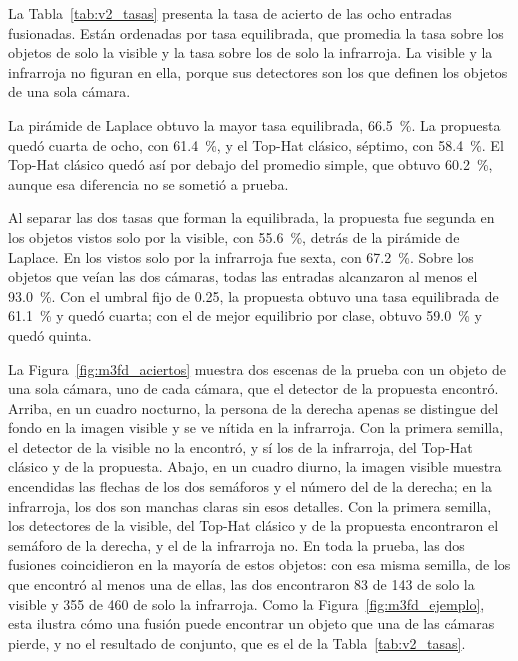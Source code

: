 La Tabla~\ref{tab:v2_tasas} presenta la tasa de acierto de las ocho entradas fusionadas. Están ordenadas
por tasa equilibrada, que promedia la tasa sobre los objetos de solo la visible y la tasa sobre los de
solo la infrarroja. La visible y la infrarroja no figuran en ella, porque sus detectores son los que
definen los objetos de una sola cámara.



La pirámide de Laplace obtuvo la mayor tasa equilibrada, 66.5~\%. La propuesta quedó cuarta de ocho,
con 61.4~\%, y el Top-Hat clásico, séptimo, con 58.4~\%. El Top-Hat clásico quedó así por debajo del
promedio simple, que obtuvo 60.2~\%, aunque esa diferencia no se sometió a prueba.

Al separar las dos tasas que forman la equilibrada, la propuesta fue segunda en los objetos vistos solo
por la visible, con 55.6~\%, detrás de la pirámide de Laplace. En los vistos solo por la infrarroja fue
sexta, con 67.2~\%. Sobre los objetos que veían las dos cámaras, todas las entradas alcanzaron al menos
el 93.0~\%. Con el umbral fijo de 0.25, la propuesta obtuvo una tasa equilibrada de 61.1~\% y quedó
cuarta; con el de mejor equilibrio por clase, obtuvo 59.0~\% y quedó quinta.

La Figura~\ref{fig:m3fd_aciertos} muestra dos escenas de la prueba con un objeto de una sola cámara,
uno de cada cámara, que el detector de la propuesta encontró. Arriba, en un cuadro nocturno, la
persona de la derecha apenas se distingue del fondo en la imagen visible y se ve nítida en la
infrarroja. Con la primera semilla, el detector de la visible no la encontró, y sí los de la
infrarroja, del Top-Hat clásico y de la propuesta. Abajo, en un cuadro diurno, la imagen visible
muestra encendidas las flechas de los dos semáforos y el número del de la derecha; en la infrarroja,
los dos son manchas claras sin esos detalles. Con la primera semilla, los detectores de la visible, del
Top-Hat clásico y de la propuesta encontraron el semáforo de la derecha, y el de la infrarroja no. En
toda la prueba, las dos fusiones coincidieron en la mayoría de estos objetos: con esa misma semilla, de
los que encontró al menos una de ellas, las dos encontraron 83 de 143 de solo la visible y 355 de 460
de solo la infrarroja. Como la Figura~\ref{fig:m3fd_ejemplo}, esta
ilustra cómo una fusión puede encontrar un objeto que una de las cámaras pierde, y no el resultado de
conjunto, que es el de la Tabla~\ref{tab:v2_tasas}.


